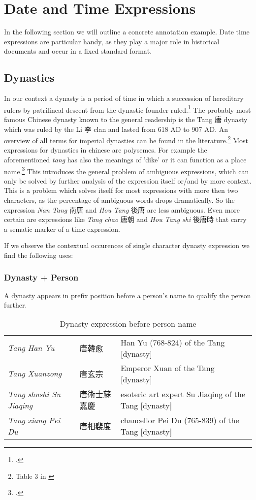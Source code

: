 \documentclass[12pt, draft]{article}
\begin{document}
\section{Date and Time Expressions}

In the following section we will outline a concrete annotation example.
Date time expressions are particular handy, as they play a major role in 
historical documents and occur in a fixed standard format.

\subsection{Dynasties}

In our context a dynasty is a period of time in which a succession of hereditary
rulers by patrilineal descent from the dynastic founder ruled.\footcite[3]{Wilkinson:2012} 
The probably most famous Chinese dynasty known to the general readership
is the Tang 唐 dynasty which was ruled by the Li 李 clan and lasted from 618 AD to 907 AD.
An overview of all terms for imperial dynasties can be found in the literature.\footnote{
Table 3 in \cite[4]{Wilkinson:2012}}
Most expressions for dynasties in chinese are polysemes. For example the aforementioned
\emph{tang} has also the meanings of 'dike' or it can function as a place name.\footcite[117]{Wang:2000}
This introduces the general problem of ambiguous expressions, which can only be solved
by further analysis of the expression itself or/and by more context. This is a problem
which solves itself for most expressions with more then two characters, as the percentage
of ambiguous words drops dramatically. So the expression \emph{Nan Tang} 南唐
and \emph{Hou Tang} 後唐 are less ambiguous. Even more certain are expressions like
\emph{Tang chao} 唐朝 and \emph{Hou Tang shi} 後唐時 that carry a sematic marker
of a time expression.

If we observe the contextual occurences of single character dynasty expression we find the
following uses:

\subsubsection{Dynasty + Person}
A dynasty appears in prefix position before a person's name to qualify the person further.

{\tiny
\begin{table}[h]
\caption{Dynasty expression before person name}
\begin{tabular}{lll}
\emph{Tang Han Yu} & 唐韓愈 & Han Yu (768-824) of the Tang [dynasty] \\
\emph{Tang Xuanzong} & 唐玄宗 & Emperor Xuan of the Tang [dynasty] \\
\emph{Tang shushi Su Jiaqing} &  唐術士蘇嘉慶 & esoteric art expert Su Jiaqing of the Tang [dynasty] \\
\emph{Tang xiang Pei Du} &  唐相裴度 & chancellor Pei Du (765-839) of the Tang [dynasty] \\
\end{tabular}
\end{table}
}
\end{document}

